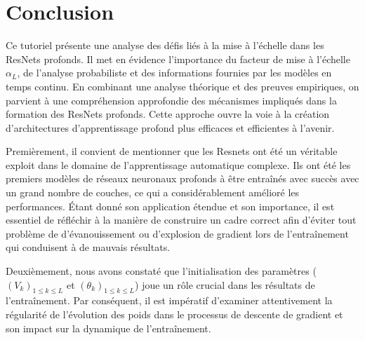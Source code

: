 \chapter{Conclusion}
Ce tutoriel présente une analyse des défis liés à la mise à l'échelle dans les ResNets profonds. Il met en évidence l'importance du facteur de mise à l'échelle \(\alpha_L\), de l'analyse probabiliste et des informations fournies par les modèles en temps continu. En combinant une analyse théorique et des preuves empiriques, on parvient à une compréhension approfondie des mécanismes impliqués dans la formation des ResNets profonds. Cette approche ouvre la voie à la création d'architectures d'apprentissage profond plus efficaces et efficientes à l'avenir.

Premièrement, il convient de mentionner que les Resnets ont été un véritable exploit dans le domaine de l'apprentissage automatique complexe. Ils ont été les premiers modèles de réseaux neuronaux profonds à être entraînés avec succès avec un grand nombre de couches, ce qui a considérablement amélioré les performances. Étant donné son application étendue et son importance, il est essentiel de réfléchir à la manière de construire un cadre correct afin d'éviter tout problème de d'évanouissement ou d'explosion de gradient lors de l'entraînement qui conduisent à de mauvais résultats.

Deuxièmement, nous avons constaté que l'initialisation des paramètres ($(V_k)_{1\leqslant k \leqslant L }$ et $(\theta_k)_{1\leqslant k \leqslant L }$) joue un rôle crucial dans les résultats de l'entraînement. Par conséquent, il est impératif d'examiner attentivement la régularité de l'évolution des poids dans le processus de descente de gradient et son impact sur la dynamique de l'entraînement.